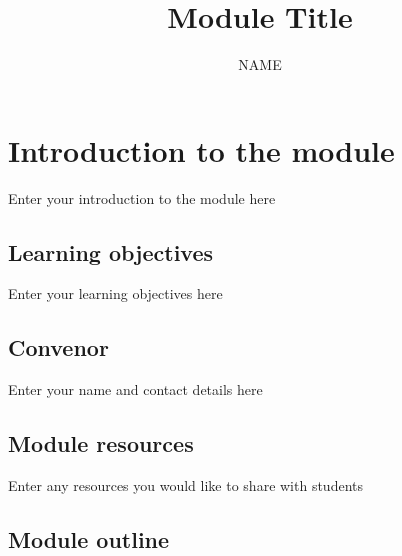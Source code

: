 \documentclass[
  letterpaper,
  oneside]{book}
\title{Module Title}
\author{NAME}
\date{}
\numberwithin{equation}{section}
\numberwithin{figure}{section}
\theoremstyle{break}
\renewcommand*\contentsname{Table of contents}
\newcommand\contentsname{Table of contents}
\begin{document}
\frontmatter
\maketitle

\renewcommand*\contentsname{Table of contents}
{
\setcounter{tocdepth}{2}
\tableofcontents
}
\listoffigures
\listoftables

\mainmatter
{}

\chapter*{Introduction to the module}\label{introduction-to-the-module}


Enter your introduction to the module here

\section*{Learning objectives}\label{learning-objectives}


Enter your learning objectives here

\section*{Convenor}\label{convenor}


Enter your name and contact details here

\section*{Module resources}\label{module-resources}


Enter any resources you would like to share with students

\section*{Module outline}\label{module-outline}
\end{document}
